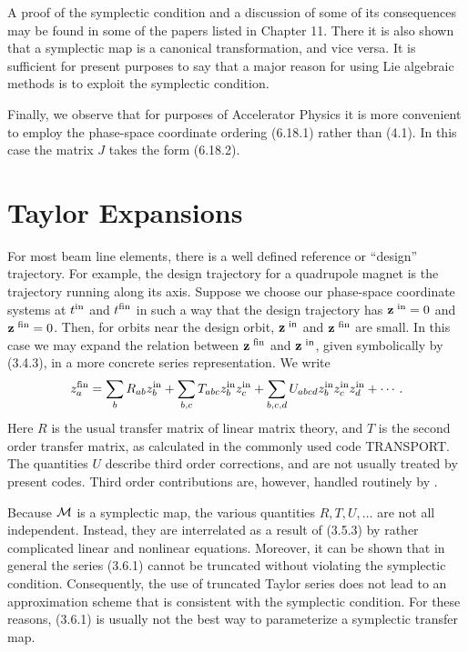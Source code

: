      A proof of the symplectic condition and a discussion of some of its
consequences may be found in some of the papers listed in Chapter 11.  There it is also shown that a symplectic map is a
canonical transformation, and vice versa.  It is sufficient for present
purposes to say that a major reason for using Lie algebraic methods is to
exploit the symplectic condition.

Finally, we observe that for purposes of Accelerator Physics it is more convenient to employ the phase-space coordinate ordering (6.18.1) rather than (4.1).  In this case the matrix $J$ takes the form (6.18.2).

\section{Taylor Expansions}
\label{taylor}
     For most beam line elements, there is a well defined reference or
``design'' trajectory.  For example, the design trajectory for a quadrupole
magnet is the trajectory running along its axis.  Suppose we choose our
phase-space coordinate systems at $t^{\mbox{\scriptsize in}}$ and $t^{\mbox{\scriptsize fin}}$ in such a way that the
design trajectory has ${\bf z}^{\mbox{\scriptsize \ in}} = 0$ and ${\bf z}^{\mbox{\scriptsize \ fin}} = 0$.  Then, for orbits near the
design orbit, ${\bf z}^{\mbox{\scriptsize \ in}}$ and
${\bf z}^{\mbox{\scriptsize \ fin}}$ are small.  In this case we may expand the
relation between ${\bf z}^{\mbox{\scriptsize \ fin}}$ and
${\bf z}^{\mbox{\scriptsize \ in}}$, given symbolically by (3.4.3), in a more
concrete series representation.  We write
\begin{equation}
z_a^{\mbox{\scriptsize fin}} = \sum_b R_{ab} z_b^{\mbox{\scriptsize in}} +
\sum_{b,c} T_{abc} z_b^{\mbox{\scriptsize in}} z_c^{\mbox{\scriptsize in}} +
       \sum_{b,c,d} U_{abcd} z_b^{\mbox{\scriptsize in}} z_c^{\mbox{\scriptsize in}} z_d^{\mbox{\scriptsize in}} + \cdots .
\end{equation}
Here $R$ is the usual transfer matrix of linear matrix theory, and $T$ is the
second order transfer matrix, as calculated in the commonly used code
TRANSPORT.  The quantities $U$ describe third order corrections, and are not
usually treated by present codes.  Third order contributions are, however,
handled routinely by .  

     Because ${\cal M}$ is a symplectic map, the various quantities $R, T, U, \ldots$ are
not all independent.  Instead, they are interrelated as a result of (3.5.3)
by rather complicated linear and nonlinear equations.  Moreover, it can be
shown that in general the series (3.6.1) cannot be truncated without
violating the symplectic condition.  Consequently, the use of truncated
Taylor series does not lead to an approximation scheme that is consistent
with the symplectic condition.  For these reasons, (3.6.1) is usually not the best way to
parameterize a symplectic transfer map.

